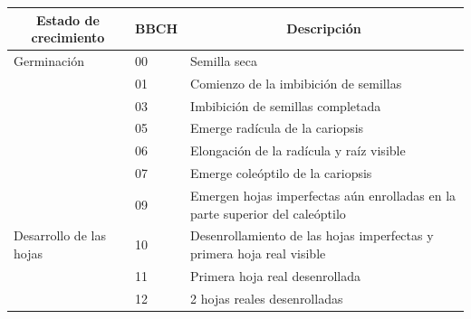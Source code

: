 \begin{longtable}{p{3cm}p{1cm}p{9cm}}
\multicolumn{1}{c}{Estado de crecimiento} & BBCH & \multicolumn{1}{c}{Descripción}                                                                                                          \\ \hline
Germinación                             & 00   & Semilla seca                                                                                                                             \\
                                           & 01   & Comienzo de la imbibición de semillas                                                                                                    \\
                                           & 03   & Imbibición de semillas completada                                                                                                        \\
                                           & 05   & Emerge radícula de la cariopsis                                                                                                          \\
                                           & 06   & Elongación de la radícula y raíz visible                                                                                                 \\
                                           & 07   & Emerge coleóptilo de la cariopsis                                                                                                        \\
                                           & 09   & Emergen hojas imperfectas aún enrolladas en la parte superior del caleóptilo                                                             \\ \hline
Desarrollo de las hojas                    & 10   & Desenrollamiento de las hojas imperfectas y primera hoja real visible                                                                    \\
                                           & 11   & Primera hoja real desenrollada                                                                                                           \\
                                           & 12   & 2 hojas reales desenrolladas                                                                                                             \\

\end{longtable}
